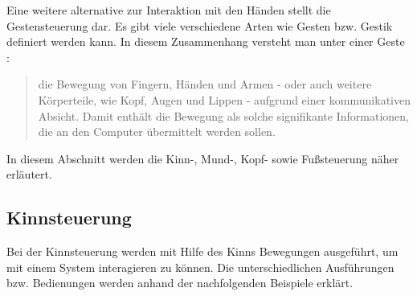 Eine weitere alternative zur Interaktion mit den Händen stellt die Gestensteuerung dar. Es gibt viele verschiedene Arten wie Gesten bzw. Gestik definiert werden kann. In diesem Zusammenhang versteht man unter einer Geste \cite{PreimDachselt}:
\begin{quote} die Bewegung von Fingern, Händen und Armen - oder auch weitere Körperteile, wie Kopf, Augen und Lippen - aufgrund einer kommunikativen Absicht. Damit enthält die Bewegung als solche signifikante Informationen, die an den Computer übermittelt werden sollen. \end{quote}
In diesem Abschnitt werden die Kinn-, Mund-, Kopf- sowie Fußsteuerung näher erläutert. 


\subsection{Kinnsteuerung}

Bei der Kinnsteuerung werden mit Hilfe des Kinns Bewegungen ausgeführt, um mit einem System interagieren zu können. Die unterschiedlichen Ausführungen bzw. Bedienungen werden anhand der nachfolgenden Beispiele erklärt.

